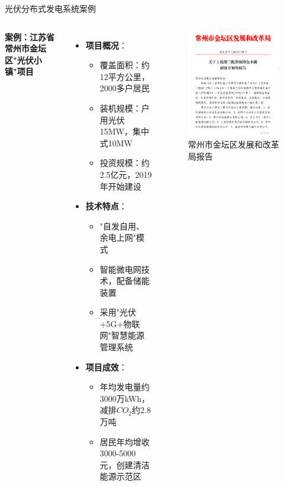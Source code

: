 \documentclass[aspectratio=169]{beamer}
\begin{document}
\begin{frame}{光伏分布式发电系统案例}
  \begin{columns}
    \textbf{案例：江苏省常州市金坛区"光伏小镇"项目}
    \begin{itemize}
      \item \textbf{项目概况}：
        \begin{itemize}
          \item 覆盖面积：约12平方公里，2000多户居民
          \item 装机规模：户用光伏15MW，集中式10MW
          \item 投资规模：约2.5亿元，2019年开始建设\cite{Sun2022}
        \end{itemize}
      \item \textbf{技术特点}：
        \begin{itemize}
          \item "自发自用、余电上网"模式
          \item 智能微电网技术，配备储能装置
          \item 采用"光伏+5G+物联网"智慧能源管理系统
        \end{itemize}
      \item \textbf{项目成效}：
        \begin{itemize}
          \item 年均发电量约3000万kWh，减排$CO_2$约2.8万吨
          \item 居民年均增收3000-5000元，创建清洁能源示范区
        \end{itemize}
    \end{itemize}
    \begin{figure}
      \centering
      \caption{常州市金坛区发展和改革局报告}
      \includegraphics[width=\textwidth]{fig/光伏小镇.png}

\end{figure}
\end{columns}
\end{frame}
\end{document}

